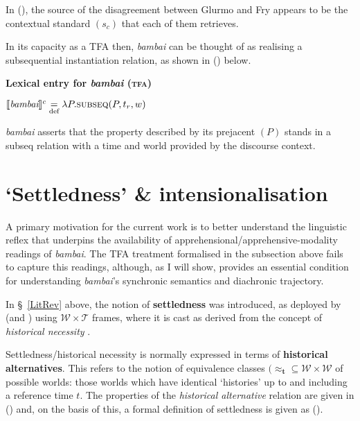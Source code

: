 In (), the source of the disagreement between Glurmo and Fry appears to be the contextual standard $ (s_c) $ that each of them retrieves.
	
	In its capacity as a TFA then, \textit{bambai} can be thought of as realising a subsequential instantiation relation, as shown in (\nextx) below.
	
\pex \textbf{Lexical entry for \textit{bambai} (\textsc{tfa})}

	$\denote[c]{\textit{bambai}}\underset{\text{def}}{=}\lambda P.\text{{\sc subseq}}(P,t_r,w)$

\textit{bambai} asserts that the property described by its prejacent $ (P) $ stands in a {\sc subseq} relation with a time and world provided by the discourse context.
\xe
	
	
	\section{`Settledness' \& intensionalisation}\label{modSems}
	
A primary motivation for the current work is to better understand the linguistic reflex that underpins the availability of apprehensional/apprehensive-modality readings of \textit{bambai}. The TFA treatment formalised in the subsection above fails to capture this readings, although, as I will show, provides an essential condition for understanding \textit{bambai}'s synchronic semantics and diachronic trajectory.

In §~\ref{LitRev} above, the notion of \textbf{settledness} was introduced, as deployed by \citet{Condoravdi2002} (and \citealp{Kaufmann2005}) using $ \mathcal{W\times T} $ frames, where it is cast as derived from the concept of \textit{historical necessity} \citep{Thomason1970}. 


Settledness/historical necessity is normally expressed in terms of \textbf{historical alternatives}. This refers to the notion of equivalence classes $\boldsymbol{(\approx_{t}}\subseteq\mathcal{W\times W}$ of possible worlds: those worlds which have identical `histories' up to and including a reference time $t$. The properties of the \textit{historical alternative} relation are given in (\nextx) and, on the basis of this, a formal definition of settledness is given as (\anextx).


